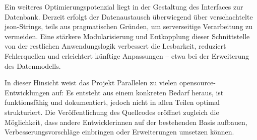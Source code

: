 Ein weiteres Optimierungspotenzial liegt in der Gestaltung des Interfaces zur Datenbank. Derzeit erfolgt der Datenaustausch überwiegend über verschachtelte \gls{json}-Strings, teils aus pragmatischen Gründen, um serverseitige Verarbeitung zu vermeiden. Eine stärkere Modularisierung und Entkopplung dieser Schnittstelle von der restlichen Anwendungslogik verbessert die Lesbarkeit, reduziert Fehlerquellen und erleichtert künftige Anpassungen -- etwa bei der Erweiterung des Datenmodells.

In dieser Hinsicht weist das Projekt Parallelen zu vielen \gls{opensource}-Entwicklungen auf: Es entsteht aus einem konkreten Bedarf heraus, ist funktionsfähig und dokumentiert, jedoch nicht in allen Teilen optimal strukturiert. Die Veröffentlichung des Quellcodes eröffnet zugleich die Möglichkeit, dass andere Entwickler\genderstern innen auf der bestehenden Basis aufbauen, Verbesserungsvorschläge einbringen oder Erweiterungen umsetzen können.
